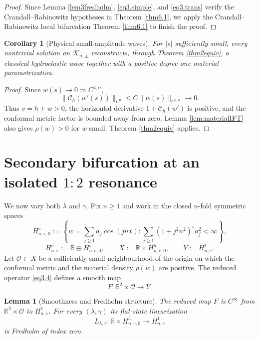 \documentclass[12pt]{article}
\numberwithin{equation}{section}
\newtheorem{corollary}[subsection]{Corollary}
\newtheorem{lemma}[theorem]{Lemma}
\numberwithin{equation}{section}
\begin{document}
\begin{proof}
Since Lemma \ref{lem3fredholm}, \eqref{eq3.simple}, and \eqref{eq3.trans} verify the
Crandall--Rabinowitz hypotheses in Theorem \ref{thm6.1}, we apply the Crandall--Rabinowitz local bifurcation Theorem \ref{thm6.1} to finish the proof.
\end{proof}

\begin{corollary}[Physical small-amplitude waves]\label{cor3physical}
For $|s|$ sufficiently small, every nontrivial solution on $\mathcal K_{n,\pm}$
reconstructs, through Theorem \ref{thm2equiv}, a classical hydroelastic wave together
with a positive degree-one material parametrization.
\end{corollary}

\begin{proof}
Since $w(s)\to0$ in $C^{4,\alpha}$,
\[
\|\mathcal C_h(w'(s))\|_{C^0}
\le C\|w(s)\|_{C^{4,\alpha}}\to0.
\]
Thus $v=h+w>0$, the horizontal derivative
$1+\mathcal C_h(w')$ is positive, and the conformal metric factor is bounded away from
zero.  Lemma \ref{lem:materialIFT} also gives $\rho(w)>0$ for $w$ small.
Theorem \ref{thm2equiv} applies.
\end{proof}


\section{Secondary bifurcation at an isolated $1{:}2$ resonance}
\label{sec:secondary}

We now vary both $\lambda$ and $\gamma$.  Fix $n\ge1$ and work in the closed
$n$-fold symmetric spaces
\[
H^s_{n,e,0}
:=
\left\{
w=\sum_{j\ge1}a_j\cos(jnx):
\sum_{j\ge1}(1+j^2n^2)^s a_j^2<\infty
\right\},
\]
\[
H^s_{n,e}
:=
\mathbb R\oplus H^s_{n,e,0},
\qquad
X:=\mathbb R\times H^5_{n,e,0},
\qquad
Y:=H^1_{n,e}.
\]
Let $\mathcal O\subset X$ be a sufficiently small neighbourhood of the origin on which
the conformal metric and the material density $\rho(w)$ are positive.  The reduced
operator \eqref{eq3.4} defines a smooth map
\[
F:\mathbb R^2\times\mathcal O\to Y.
\]

\begin{lemma}[Smoothness and Fredholm structure]\label{lem4smooth}
The reduced map $F$ is $C^\infty$ from $\mathbb R^2\times\mathcal O$ to $H^1_{n,e}$.
For every $(\lambda,\gamma)$ its flat-state linearization
\[
L_{\lambda,\gamma}:
\mathbb R\times H^5_{n,e,0}\to H^1_{n,e}
\]
is Fredholm of index zero.
\end{lemma}
\end{document}
